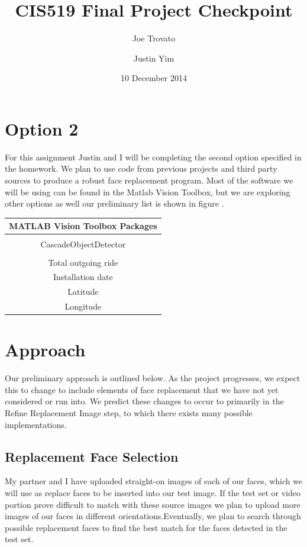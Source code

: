 \documentclass[10pt, twocolumn]{article}
\begin{document}
\title{CIS519 Final Project Checkpoint\vspace{-2ex}}
\author{Joe Trovato \and Justin Yim\vspace{-2ex}}
\date{10 December 2014\vspace{-2ex}}
\maketitle

\section{Option 2}
For this assignment Justin and I will be completing the second option specified in the homework. We plan to use code from previous projects and third party sources to produce a robust face replacement program. Most of the software we will be using can be found in the Matlab Vision Toolbox, but we are exploring other options as well our preliminary list is shown in figure .

	\begin{center}
		\begin{tabular}{|c|}
			\hline
			MATLAB Vision Toolbox Packages \\
			\hline
			\\
			CascadeObjectDetector\\
			\\
			Total outgoing ride\\
			Installation date\\
			Latitude\\
			Longitude\\
			\hline
		\end{tabular}
	\end{center}


\section{Approach}
Our preliminary approach is outlined below. As the project progresses, we expect this to change to include elements of face replacement that we have not yet considered or run into. We predict these changes to occur to primarily in the Refine Replacement Image step, to which there exists many possible implementations.

\subsection{Replacement Face Selection}
My partner and I have uploaded straight-on images of each of our faces, which we will use as replace faces to be inserted into our test image. If the test set or video portion prove difficult to match with these source images we plan to upload more images of our faces in different orientations.Eventually, we plan to search through possible replacement faces to find the best match for the faces detected in the test set.
\end{document}
